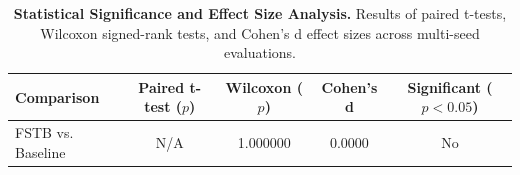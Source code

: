 \begin{table}[htbp]
\centering
\caption{\textbf{Statistical Significance and Effect Size Analysis.} Results of paired t-tests, Wilcoxon signed-rank tests, and Cohen's d effect sizes across multi-seed evaluations.}
\label{tab:statistical_significance}
\begin{tabular}{l c c c c}
\toprule
\textbf{Comparison} & \textbf{Paired t-test ($p$)} & \textbf{Wilcoxon ($p$)} & \textbf{Cohen's d} & \textbf{Significant ($p<0.05$)} \\
\midrule
FSTB vs. Baseline & N/A & 1.000000 & 0.0000 & No \\
\bottomrule
\end{tabular}
\end{table}
